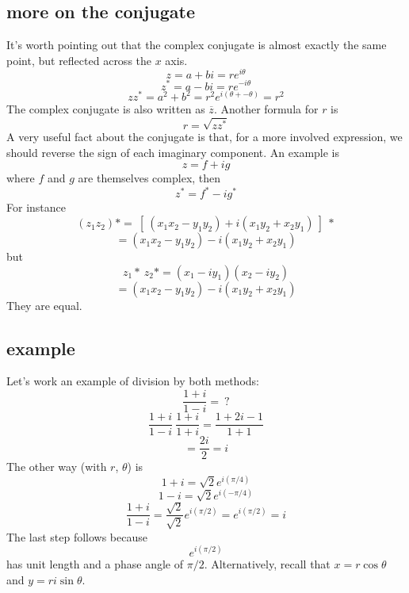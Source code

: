 \documentclass[11pt, oneside]{article}   	%
\begin{document}
\subsection*{more on the conjugate}
It's worth pointing out that the complex conjugate is almost exactly the same point, but reflected across the $x$ axis.
\[ z = a + bi = r e^{i\theta} \]
\[ z^* = a - bi = r e^{-i\theta} \]
\[ z z^* = a^2 + b^2 = r^2 e^{i(\theta + - \theta)} = r^2 \]
The complex conjugate is also written as $\overline{z}$.  Another formula for $r$ is
\[ r = \sqrt{z z^*} \]
A very useful fact about the conjugate is that, for a more involved expression, we should reverse the sign of each imaginary component.  An example is
\[ z = f + ig \]
where $f$ and $g$ are themselves complex, then
\[ z^* = f^* - ig^* \]
For instance
\[ (z_1 z_2)* = \ [ \ (x_1 x_2 - y_1 y_2 )+ i (x_1 y_2 + x_2 y_1) \ ] \ * \]
\[ =  (x_1 x_2 - y_1 y_2 ) - i (x_1 y_2 + x_2 y_1) \]
but
\[ z_1* \ z_2* = (x_1 - i y_1) (x_2 - i y_2) \]
\[ = (x_1 x_2 - y_1 y_2) - i (x_1 y_2 + x_2 y_1) \]
They are equal.

\subsection*{example}
Let's work an example of division by both methods:
\[ \frac{1+i}{1-i} = \ ? \]
\[ \frac{1+i}{1-i} \ \frac{1+i}{1+i} = \frac{1 + 2i - 1}{1 + 1} \]
\[ = \frac{2i}{2} = i  \]
The other way (with $r$, $\theta$) is
\[ 1 + i = \sqrt{2}e^{i (\pi/4)} \]
\[ 1 - i = \sqrt{2}e^{i (-\pi/4)} \]
\[ \frac{1+i}{1-i} = \frac{\sqrt{2}}{\sqrt{2}} e^{i (\pi/2)} = e^{i (\pi/2)} = i \]
The last step follows because
\[ e^{i (\pi/2)} \]
has unit length and a phase angle of $\pi/2$.  Alternatively, recall that $x = r \cos \theta$ and $y = r i \sin \theta$.
\end{document}
